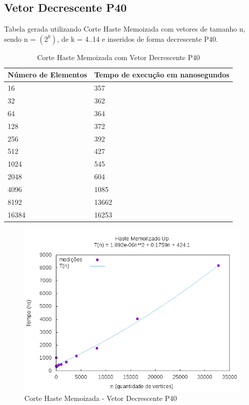 \documentclass[12pt,a4paper,twoside]{report}
\begin{document}
\subsection{Vetor Decrescente P40}
Tabela gerada utilizando Corte Haste Memoizada com vetores de tamanho n, sendo n = $(2^k)$, de k = 4..14 e inseridos de forma decrescente P40.
\begin{table}[H]
\centering
\caption{Corte Haste Memoizada com Vetor Decrescente P40}
\label{my-label}
\begin{tabular}{|l|l|}
\hline
\multicolumn{1}{|c|}{\textbf{Número de Elementos}} & \multicolumn{1}{c|}{\textbf{Tempo de execução em nanosegundos}} \\ \hline
16 & 357 \\ \hline
32 & 362 \\ \hline
64 & 364 \\ \hline
128 & 372 \\ \hline
256 & 392 \\ \hline
512 & 427 \\ \hline
1024 & 545 \\ \hline
2048 & 604 \\ \hline
4096 & 1085 \\ \hline
8192 & 13662 \\ \hline
16384 & 16253 \\ \hline

\end{tabular}
\end{table}

\begin{figure}[H]
    \centering
    \includegraphics[width=0.7\linewidth]{graficos/CorteHasteMemorizado/DecrescenteP40/HasteMemo.png}
  \caption{Corte Haste Memoizada - Vetor Decrescente P40}
\end{figure}
\end{document}
